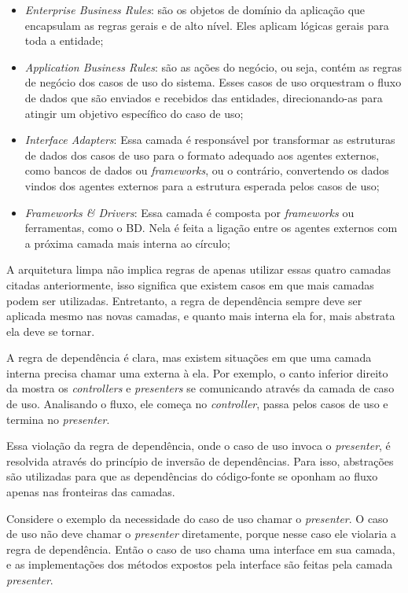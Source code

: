 \begin{itemize}
    \item \textit{Enterprise Business Rules}: são os objetos de domínio da aplicação que encapsulam as regras gerais e de alto nível. Eles aplicam lógicas gerais para toda a entidade;
    \item \textit{Application Business Rules}: são as ações do negócio, ou seja, contém as regras de negócio dos casos de uso do sistema. Esses casos de uso orquestram o fluxo de dados que são enviados e recebidos das entidades, direcionando-as para atingir um objetivo específico do caso de uso;
    \item \textit{Interface Adapters}: Essa camada é responsável por transformar as estruturas de dados dos casos de uso para o formato adequado aos agentes externos, como bancos de dados ou \textit{frameworks}, ou o contrário, convertendo os dados vindos dos agentes externos para a estrutura esperada pelos casos de uso;
    \item \textit{Frameworks \& Drivers}: Essa camada é composta por \textit{frameworks} ou ferramentas, como o BD. Nela é feita a ligação entre os agentes externos com a próxima camada mais interna ao círculo;
\end{itemize}

A arquitetura limpa não implica regras de apenas utilizar essas quatro camadas citadas anteriormente, isso significa que existem casos em que mais camadas podem ser utilizadas. Entretanto, a regra de dependência sempre deve ser aplicada mesmo nas novas camadas, e quanto mais interna ela for, mais abstrata ela deve se tornar.

A regra de dependência é clara, mas existem situações em que uma camada interna precisa chamar uma externa à ela. Por exemplo, o canto inferior direito da  mostra os \textit{controllers} e \textit{presenters} se comunicando através da camada de caso de uso. Analisando o fluxo, ele começa no \textit{controller}, passa pelos casos de uso e termina no \textit{presenter}.

Essa violação da regra de dependência, onde o caso de uso invoca o \textit{presenter}, é resolvida através do princípio de inversão de dependências. Para isso, abstrações são utilizadas para que as dependências do código-fonte se oponham ao fluxo apenas nas fronteiras das camadas.

Considere o exemplo da necessidade do caso de uso chamar o \textit{presenter}. O caso de uso não deve chamar o \textit{presenter} diretamente, porque nesse caso ele violaria a regra de dependência. Então o caso de uso chama uma interface em sua camada, e as implementações dos métodos expostos pela interface são feitas pela camada \textit{presenter}.

